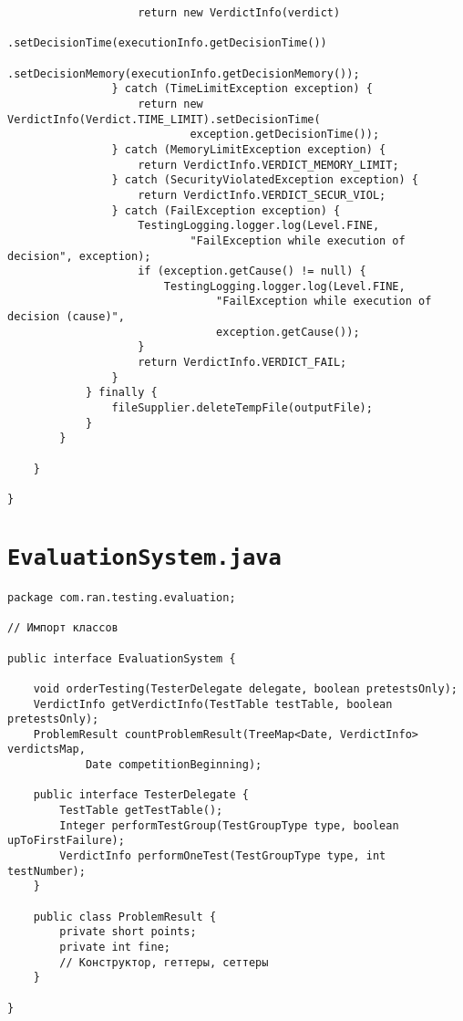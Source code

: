 \begin{verbatim}
                    return new VerdictInfo(verdict)
                            .setDecisionTime(executionInfo.getDecisionTime())
                            .setDecisionMemory(executionInfo.getDecisionMemory());
                } catch (TimeLimitException exception) {
                    return new VerdictInfo(Verdict.TIME_LIMIT).setDecisionTime(
                            exception.getDecisionTime());
                } catch (MemoryLimitException exception) {
                    return VerdictInfo.VERDICT_MEMORY_LIMIT;
                } catch (SecurityViolatedException exception) {
                    return VerdictInfo.VERDICT_SECUR_VIOL;
                } catch (FailException exception) {
                    TestingLogging.logger.log(Level.FINE,
                            "FailException while execution of decision", exception);
                    if (exception.getCause() != null) {
                        TestingLogging.logger.log(Level.FINE,
                                "FailException while execution of decision (cause)",
                                exception.getCause());
                    }
                    return VerdictInfo.VERDICT_FAIL;
                }
            } finally {
                fileSupplier.deleteTempFile(outputFile);
            }
        }
        
    }

}
\end{verbatim}

\section*{\texttt{EvaluationSystem.java}}
\begin{verbatim}
package com.ran.testing.evaluation;

// Импорт классов

public interface EvaluationSystem {

    void orderTesting(TesterDelegate delegate, boolean pretestsOnly);
    VerdictInfo getVerdictInfo(TestTable testTable, boolean pretestsOnly);
    ProblemResult countProblemResult(TreeMap<Date, VerdictInfo> verdictsMap,
            Date competitionBeginning);

    public interface TesterDelegate {
        TestTable getTestTable();
        Integer performTestGroup(TestGroupType type, boolean upToFirstFailure);
        VerdictInfo performOneTest(TestGroupType type, int testNumber);
    }
    
    public class ProblemResult {
        private short points;
        private int fine;
        // Конструктор, геттеры, сеттеры
    }

}
\end{verbatim}

